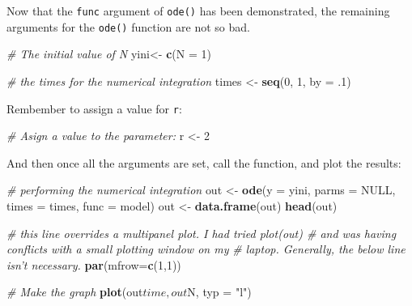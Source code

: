 \documentclass[]{book}
\newenvironment{Shaded}{\begin{snugshade}}{\end{snugshade}}
\newcommand{\KeywordTok}[1]{\textcolor[rgb]{0.13,0.29,0.53}{\textbf{{#1}}}}
\newcommand{\DataTypeTok}[1]{\textcolor[rgb]{0.13,0.29,0.53}{{#1}}}
\newcommand{\DecValTok}[1]{\textcolor[rgb]{0.00,0.00,0.81}{{#1}}}
\newcommand{\StringTok}[1]{\textcolor[rgb]{0.31,0.60,0.02}{{#1}}}
\newcommand{\CommentTok}[1]{\textcolor[rgb]{0.56,0.35,0.01}{\textit{{#1}}}}
\newcommand{\OtherTok}[1]{\textcolor[rgb]{0.56,0.35,0.01}{{#1}}}
\newcommand{\NormalTok}[1]{{#1}}
\begin{document}
Now that the \texttt{func} argument of \texttt{ode()} has been
demonstrated, the remaining arguments for the \texttt{ode()} function
are not so bad.

\begin{Shaded}
\begin{Highlighting}[]
\CommentTok{# The initial value of N}
\NormalTok{yini<-}\StringTok{ }\KeywordTok{c}\NormalTok{(}\DataTypeTok{N =} \DecValTok{1}\NormalTok{)}

\CommentTok{# the times for the numerical integration}
\NormalTok{times <-}\StringTok{ }\KeywordTok{seq}\NormalTok{(}\DecValTok{0}\NormalTok{, }\DecValTok{1}\NormalTok{, }\DataTypeTok{by =} \NormalTok{.}\DecValTok{1}\NormalTok{)}
\end{Highlighting}
\end{Shaded}

Rembember to assign a value for \texttt{r}:

\begin{Shaded}
\begin{Highlighting}[]
\CommentTok{# Asign a value to the parameter:}
\NormalTok{r <-}\StringTok{ }\DecValTok{2}
\end{Highlighting}
\end{Shaded}

And then once all the arguments are set, call the function, and plot the
results:

\begin{Shaded}
\begin{Highlighting}[]
\CommentTok{# performing the numerical integration}
\NormalTok{out <-}\StringTok{ }\KeywordTok{ode}\NormalTok{(}\DataTypeTok{y =} \NormalTok{yini, }\DataTypeTok{parms =} \OtherTok{NULL}\NormalTok{, }\DataTypeTok{times =} \NormalTok{times, }\DataTypeTok{func =} \NormalTok{model)}
\NormalTok{out <-}\StringTok{ }\KeywordTok{data.frame}\NormalTok{(out)}
\KeywordTok{head}\NormalTok{(out)}

\CommentTok{# this line overrides a multipanel plot. I had tried plot(out) # and was having conflicts with a small plotting window on my}
\CommentTok{# laptop. Generally, the below line isn't necessary.}
\KeywordTok{par}\NormalTok{(}\DataTypeTok{mfrow=}\KeywordTok{c}\NormalTok{(}\DecValTok{1}\NormalTok{,}\DecValTok{1}\NormalTok{))}

\CommentTok{# Make the graph}
\KeywordTok{plot}\NormalTok{(out$time, out$N, }\DataTypeTok{typ =} \StringTok{"l"}\NormalTok{)}
\end{Highlighting}
\end{Shaded}
\end{document}
